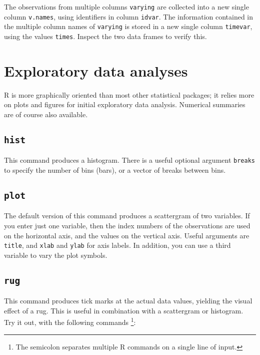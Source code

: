 \documentclass[]{book}
\begin{document}
The observations from multiple columns \texttt{varying} are
collected into a new single column \texttt{v.names}, using
identifiers in column \texttt{idvar}. The
information contained in the multiple column names of
\texttt{varying} is stored in a new single column
\texttt{timevar}, using the values \texttt{times}.
Inspect the two data frames to verify this.

\hypertarget{ch:EDA}{%
\chapter{Exploratory data analyses}\label{ch:EDA}}

R is more graphically oriented than most other
statistical packages; it relies more on plots and figures for initial
exploratory data analysis. Numerical summaries are of course also
available.

\hypertarget{hist}{%
\section{\texorpdfstring{\texttt{hist}}{hist}}\label{hist}}

This command produces a histogram. There is a useful optional
argument \texttt{breaks} to specify the number of
bins (bars), or a vector of breaks between bins.

\hypertarget{plot}{%
\section{\texorpdfstring{\texttt{plot}}{plot}}\label{plot}}

The default version of this command produces a scattergram of two
variables. If you enter just one variable, then the index numbers of
the observations are used on the horizontal axis, and the values on
the vertical axis. Useful arguments are
\texttt{title}, and \texttt{xlab}
and \texttt{ylab} for axis labels. In addition, you
can use a third variable to vary the plot symbols.

\hypertarget{rug}{%
\section{\texorpdfstring{\texttt{rug}}{rug}}\label{rug}}

This command produces tick marks at the actual data values, yielding
the visual effect of a rug. This is useful in combination with a
scattergram or histogram. Try it out, with the following
commands \footnote{The semicolon separates multiple R commands on a single line of input.}:
\end{document}
